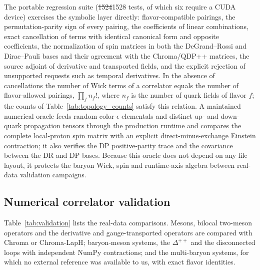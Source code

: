 \documentclass[a4paper,fleqn]{cas-dc}
\newcommand{\del}[1]{{\color{red}\sout{#1}}}
\newcommand{\add}[1]{{\color{blue}#1}}
\begin{document}
The portable regression suite (\del{1524}\add{1528} tests, of which six require a CUDA device) exercises the symbolic layer
directly: flavor-compatible pairings, the permutation-parity sign of every
pairing, the coefficients of linear combinations, exact cancellation of terms
with identical canonical form and opposite coefficients, the normalization of
spin matrices in both the DeGrand--Rossi and Dirac--Pauli bases\add{ and their agreement with the Chroma/QDP++ matrices}, the source
adjoint of derivative and transported fields, and the explicit rejection of
unsupported requests such as temporal derivatives. In the absence of
cancellations the number of Wick terms of a correlator equals the number of
flavor-allowed pairings, \(\prod_f n_f!\), where \(n_f\) is the number of quark
fields of flavor \(f\); the counts of Table~\ref{tab:topology_counts} satisfy this
relation. A maintained numerical oracle feeds random color-\(\epsilon\)
elementals and distinct up- and down-quark propagation tensors through the
production runtime and compares the complete local-proton spin matrix with an
explicit direct-minus-exchange Einstein contraction; it also verifies the DP
positive-parity trace and the covariance between the DR and DP bases. Because
this oracle does not depend on any file layout, it protects the baryon Wick,
spin and runtime-axis algebra between real-data validation campaigns.

\subsection{Numerical correlator validation}
\label{sec:validation_numerical}

Table~\ref{tab:validation} lists the real-data comparisons. Mesons, bilocal
two-meson operators and the derivative and gauge-transported operators are
compared with Chroma or Chroma-LapH; baryon-meson systems, the \(\Delta^{++}\) and
the disconnected loops with independent NumPy contractions; and the multi-baryon
systems, for which no external reference was available to us, with exact
flavor identities.
\end{document}
